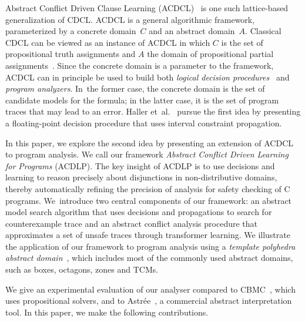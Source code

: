Abstract Conflict Driven Clause Learning (ACDCL)~\cite{dhk2013-popl} is one
such lattice-based generalization of CDCL.  ACDCL is a general algorithmic
framework, parameterized by a concrete domain~$C$ and an abstract
domain~$A$.  Classical CDCL can be viewed as an instance of ACDCL in which
$C$ is the set of propositional truth assignments and $A$ the domain of
propositional partial assignments~\cite{leo-thesis}.  Since the concrete
domain is a parameter to the framework, ACDCL can in principle
be used to build both \emph{logical decision
procedures}~\cite{DBLP:journals/fmsd/BrainDGHK14} and \emph{program
analyzers}.  In~the former case, the concrete domain is the set of candidate
models for the formula; in the latter case, it is the set of program traces
that may lead to an error.  Haller
et~al.~\cite{DBLP:journals/fmsd/BrainDGHK14} pursue the first idea by
presenting a floating-point decision procedure that uses interval constraint
propagation.


In this paper, we explore the second idea by presenting an extension of 
ACDCL to program analysis.  We call our 
framework \emph{Abstract Conflict Driven Learning for Programs}
(ACDLP).  The key insight of ACDLP is to use decisions and learning to reason 
precisely about disjunctions in non-distributive domains, thereby automatically 
refining the precision of analysis for safety checking of C programs.  
We~introduce two central components of our framework: an abstract
model search algorithm that uses decisions and propagations to 
search for counterexample trace and an abstract conflict analysis 
procedure that approximates a set of unsafe traces through transformer 
learning.
We illustrate the application of our framework to program analysis 
using a \textit{template polyhedra abstract domain}~\cite{vmcai05}, 
which includes most of the commonly used abstract domains, such as boxes, 
octagons, zones and TCMs.  

We give an experimental evaluation of our analyser compared 
to CBMC~\cite{cbmc.tacas:2004}, which uses propositional solvers, and to 
Astr{\'e}e~\cite{DBLP:conf/pldi/BlanchetCCFMMMR03}, a commercial abstract 
interpretation tool.  In this paper, we make the following contributions.

